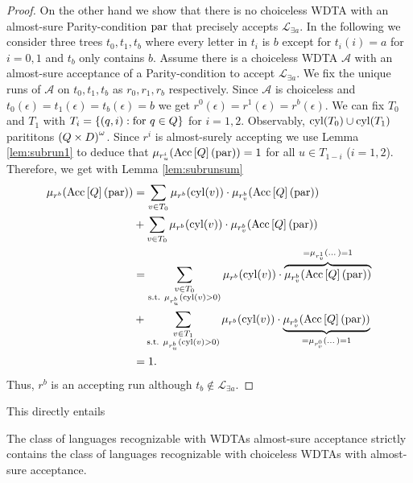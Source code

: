 \begin{proof}
  On the other hand we show that there is no choiceless \ac{WDTA} with an
  almost-sure Parity-condition $\operatorname{par}$ that precisely accepts 
  $\mathcal{L}_{\exists a}$. In the following we consider three trees 
  $t_{0}, t_{1}, t_{b}$ where every letter in $t_{i}$ is $b$ except for 
  $t_{i}(i) = a$ for $i = 0,1$ and $t_{b}$ only contains $b$. Assume there is a 
  choiceless \ac{WDTA} $\mathcal{A}$ with an almost-sure acceptance of a 
  Parity-condition to accept $\mathcal{L}_{\exists a}$. We fix the unique runs 
  of $\mathcal{A}$ on $t_{0},t_{1}, t_{b}$ as $r_{0}, r_{1}, r_{b}$ 
  respectively. Since $\mathcal{A}$ is choiceless and 
  $t_{0}(\epsilon) = t_{1}(\epsilon) = t_{b}(\epsilon) = b$ we get 
  $r^{0}(\epsilon) = r^{1}(\epsilon) = r^{b}(\epsilon)$. We can fix
  $T_{0}$ and $T_{1}$ with $T_{i} = \left\{\left(q, i\right):\text{for }q\in Q\right\}$ 
  for $i = 1,2$. Observably, $\operatorname{cyl}(T_{0})\cup\operatorname{cyl}(T_{1})$ parititons 
  $\left(Q\times D\right)^{\omega}$. Since $r^{i}$ is almost-surely accepting we use
  Lemma \ref{lem:subrun1} to deduce that 
  $\mu_{r^{i}_{u}}(\operatorname{Acc}\left[Q\right](\operatorname{par})) = 1$ for all $u\in T_{1-i}$ 
  ($i = 1,2$). Therefore, we get with Lemma \ref{lem:subrunsum}
  \begin{align*}
    \mu_{r^{b}}(\operatorname{Acc}\left[Q\right](\operatorname{par})) &= \sum_{v\in T_{0}}
      \mu_{r^{b}}(\operatorname{cyl}(v))\cdot\mu_{r^{b}_{v}}(\operatorname{Acc}\left[Q\right](\operatorname{par}))\\
    &+ \sum_{v\in T_{0}}
      \mu_{r^{b}}(\operatorname{cyl}(v))\cdot\mu_{r^{b}_{v}}(\operatorname{Acc}\left[Q\right](\operatorname{par}))\\
    &= \sum_{\substack{v\in T_{0}\\\text{s.t. }\mu_{r^{b}_{u}}(\operatorname{cyl}(v)>0)}}
      \mu_{r^{b}}(\operatorname{cyl}(v))\cdot\overbrace{\mu_{r^{b}_{v}}(
        \operatorname{Acc}\left[Q\right](\operatorname{par}))}^{=\mu_{r^{1}_{v}}(\dots)=1}\\
    &+ \sum_{\substack{v\in T_{1}\\\text{s.t. }\mu_{r^{b}_{u}}(\operatorname{cyl}(v)>0)}}
      \mu_{r^{b}}(\operatorname{cyl}(v))\cdot\underbrace{\mu_{r^{b}_{v}}(
        \operatorname{Acc}\left[Q\right](\operatorname{par}))}_{=\mu_{r^{0}_{v}}(\dots)=1}\\
    &= 1.
  \end{align*}
  Thus, $r^{b}$ is an accepting run although 
  $t_{b}\notin\mathcal{L}_{\exists a}$.
\end{proof}
This directly entails
\begin{corollary}
  The class of languages recognizable with \acp{WDTA} almost-sure acceptance
  strictly contains the class of languages recognizable with choiceless 
  \acp{WDTA} with almost-sure acceptance.
\end{corollary}
